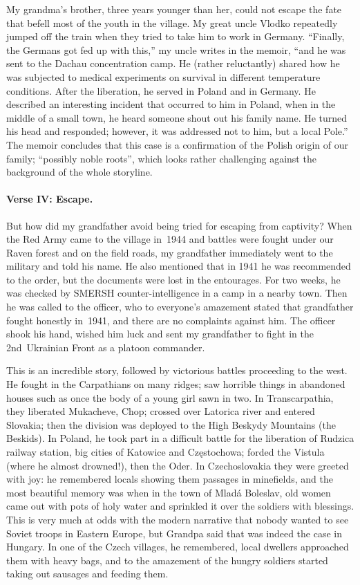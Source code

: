 My grandma's brother, three years younger than her, could not escape
the fate that befell most of the youth in the village. My great uncle
Vlodko repeatedly jumped off the train when they tried to take him to
work in Germany. ``Finally, the Germans got fed up with this,'' my
uncle writes in the memoir, ``and he was sent to the Dachau
concentration camp. He (rather reluctantly) shared how he was
subjected to medical experiments on survival in different temperature
conditions. After the liberation, he served in Poland and in
Germany. He described an interesting incident that occurred to him in
Poland, when in the middle of a small town, he heard someone shout out
his family name. He turned his head and responded; however, it was
addressed not to him, but a local Pole.'' The memoir concludes that
this case is a confirmation of the Polish origin of our family;
``possibly noble roots'', which looks rather challenging against the
background of the whole storyline.

\paragraph{Verse IV: Escape.}

But how did my grandfather avoid being tried for escaping from
captivity?  When the Red Army came to the village in~1944 and battles
were fought under our Raven forest and on the field roads, my
grandfather immediately went to the military and told his name. He
also mentioned that in 1941 he was recommended to the order, but the
documents were lost in the entourages. For two weeks, he was checked
by SMERSH counter-intelligence in a camp in a nearby town. Then he was
called to the officer, who to everyone's amazement stated that
grandfather fought honestly in~1941, and there are no complaints
against him. The officer shook his hand, wished him luck and sent my
grandfather to fight in the 2nd~Ukrainian Front as a platoon
commander.

This is an incredible story, followed by victorious battles proceeding
to the west. He fought in the Carpathians on many ridges; saw horrible
things in abandoned houses such as once the body of a young girl sawn
in two. In Transcarpathia, they liberated Mukacheve, Chop; crossed
over Latorica river and entered Slovakia; then the division was
deployed to the High Beskydy Mountains (the Beskids). In Poland, he
took part in a difficult battle for the liberation of Rudzica railway
station, big cities of Katowice and Częstochowa; forded the Vistula
(where he almost drowned!), then the Oder. In Czechoslovakia they were
greeted with joy: he remembered locals showing them passages in
minefields, and the most beautiful memory was when in the town of
Mladá Boleslav, old women came out with pots of holy water and
sprinkled it over the soldiers with blessings. This is very much at
odds with the modern narrative that nobody wanted to see Soviet troops
in Eastern Europe, but Grandpa said that was indeed the case in
Hungary. In one of the Czech villages, he remembered, local dwellers
approached them with heavy bags, and to the amazement of the hungry
soldiers started taking out sausages and feeding them.

